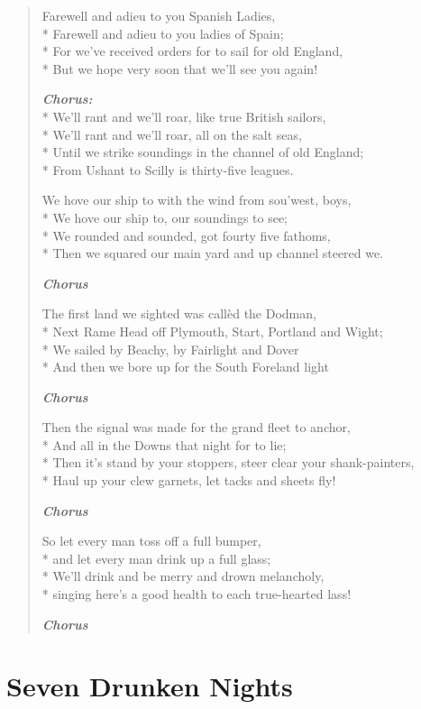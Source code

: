 \documentclass[9pt,twoside]{extarticle}
\newenvironment{xverse}{
	\begin{verse}
	\fontsize{8.5}{10.5}\selectfont
	}
	{
	\end{verse}
	\penalty 0
}
\newcommand{\chorusdef}{\textbf{\emph{Chorus:}}\\*}
\newcommand{\chorusmark}[1][1]{%
\vspace{-0.5\stanzaskip}%
\textbf{\emph{Chorus \ifthenelse{\equal{#1}{1}}{}{$\times$ #1}}}%
\vspace{-0.5\stanzaskip}%
}
\begin{document}
\begin{xverse}
Farewell and adieu to you Spanish Ladies, \\*
Farewell and adieu to you ladies of Spain; \\*
For we’ve received orders for to sail for old England, \\*
But we hope very soon that we’ll see you again!

\chorusdef
We’ll rant and we’ll roar, like true British sailors, \\*
We’ll rant and we’ll roar, all on the salt seas, \\*
Until we strike soundings in the channel of old England; \\*
From Ushant to Scilly is thirty-five leagues.
 
We hove our ship to with the wind from sou’west, boys, \\*
We hove our ship to, our soundings to see; \\*
We rounded and sounded, got fourty five fathoms, \\*
Then we squared our main yard and up channel steered we.

\chorusmark

The first land we sighted was callèd the Dodman, \\*
Next Rame Head off Plymouth, Start, Portland and Wight; \\*
We sailed by Beachy, by Fairlight and Dover \\*
And then we bore up for the South Foreland light

\chorusmark

Then the signal was made for the grand fleet to anchor, \\*
And all in the Downs that night for to lie; \\*
Then it's stand by your stoppers, steer clear your shank-painters, \\*
Haul up your clew garnets, let tacks and sheets fly!

\chorusmark

So let every man toss off a full bumper, \\*
and let every man drink up a full glass; \\*
We'll drink and be merry and drown melancholy, \\*
singing here's a good health to each true-hearted lass!

\chorusmark
\end{xverse}

\section{Seven Drunken Nights}
\end{document}
